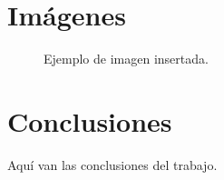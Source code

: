 \documentclass[12pt,a4paper]{article}
\begin{document}
	\section{Imágenes}
	
	\begin{figure}[H]
		\centering
		\caption{Ejemplo de imagen insertada.}
	\end{figure}
	
	\section{Conclusiones}
	
	Aquí van las conclusiones del trabajo.  
	
	
\end{document}
